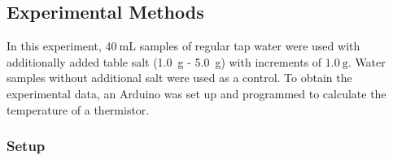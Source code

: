 \documentclass[../main.tex]{subfiles}
\begin{document}
\subsection{Experimental Methods}

In this experiment, $\SI{40}{\milli\liter}$ samples of regular tap water were used with additionally added table salt (\SI{1.0}{\gram} - \SI{5.0}{\gram}) with increments of $\SI{1.0}{\gram}$. Water samples without additional salt were used as a control. To obtain the experimental data, an Arduino was set up and programmed to calculate the temperature of a thermistor. \par

\subsubsection{Setup}
\end{document}
